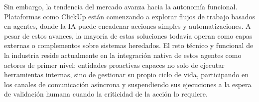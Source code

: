 Sin embargo, la tendencia del mercado avanza hacia la autonomía funcional. Plataformas como ClickUp \cite{clickup_software} están comenzando a explorar flujos de trabajo basados en agentes, donde la \ac{IA} puede encadenar acciones simples y automatizaciones. A pesar de estos avances, la mayoría de estas soluciones todavía operan como capas externas o complementos sobre sistemas heredados. El reto técnico y funcional de la industria reside actualmente en la integración nativa de estos agentes como actores de primer nivel: entidades proactivas capaces no solo de ejecutar herramientas internas, sino de gestionar su propio ciclo de vida, participando en los canales de comunicación asíncrona y suspendiendo sus ejecuciones a la espera de validación humana cuando la criticidad de la acción lo requiere.